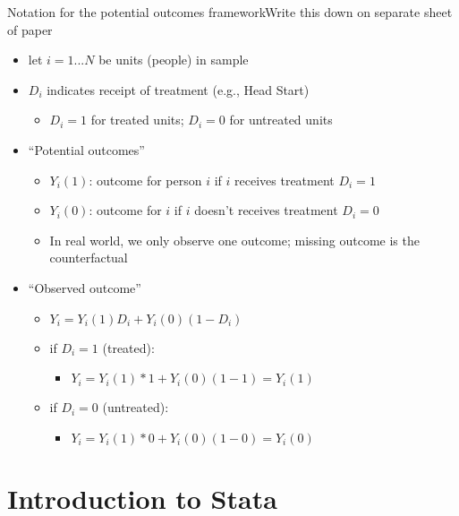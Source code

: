 \begin{frame}{Notation for the potential outcomes framework}{Write this down on separate sheet of paper}

	\begin{itemize}
		\item let $ i=1...N $ be units (people) in sample
		\item $ D_i $ indicates receipt of treatment (e.g., Head Start)
		\begin{itemize}
			\item $ D_i=1 $ for treated units; $ D_i=0 $ for untreated units
		\end{itemize}
		\item ``Potential outcomes''
		\begin{itemize}
			\item $ Y_i(1) $: outcome for person $ i $ if $ i $ receives treatment $ D_i=1 $
			\item $ Y_i(0) $: outcome for $ i $ if $ i $ doesn't receives treatment $ D_i=0 $
			\item In real world, we only observe one outcome; missing outcome is the counterfactual			
		\end{itemize}
		\item ``Observed outcome''
		\begin{itemize}
			\item $ Y_i=Y_i(1)D_i+Y_i(0)(1-D_i)$
			\item if $ D_i=1 $ (treated):
			\begin{itemize}
				\item  $Y_i=Y_i(1)*1+Y_i(0)(1-1)=Y_i(1)$
			\end{itemize}
			\item if $ D_i=0 $ (untreated): 
			\begin{itemize}
				\item $Y_i=Y_i(1)*0+Y_i(0)(1-0)=Y_i(0)$
			\end{itemize}
			
		\end{itemize}
		

	\end{itemize}
\end{frame}


\section[Stata]{Introduction to Stata}

